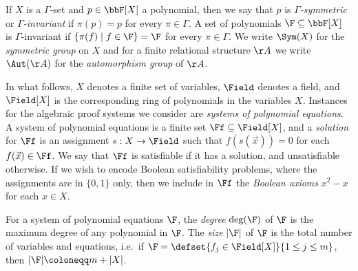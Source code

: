 \documentclass[a4paper,UKenglish,cleveref, autoref, thm-restate]{lipics-v2021}
\begin{document}
	If $X$ is a $\Gamma$-set and $p \in \bbF[X]$ a polynomial, then we say that $p$ is \emph{$\Gamma$-symmetric} or \emph{$\Gamma$-invariant} if $\pi(p) = p$ for every $\pi \in \Gamma$.  A set of polynomials $\F \subseteq \bbF[X]$ is $\Gamma$-invariant if $\{ \pi(f) \mid f \in \F  \} = \F$ for every $\pi \in \Gamma$.
	We write $\Sym(X)$ for the \emph{symmetric group} on $X$ and for a finite relational structure $\AA$ we write $\Aut(\AA)$ for the \emph{automorphism group} of $\AA$.
	
	In what follows, $X$ denotes a finite set of variables, $\Field$ denotes a field, and $\Field[X]$ is the corresponding ring of polynomials in the variables $X$. 
	Instances for the algebraic proof systems we consider are \emph{systems of polynomial equations}. A system of polynomial equations is a finite set $\Ff \subseteq \Field[X]$, and a \emph{solution} for $\Ff$ is an assignment $s: X \rightarrow \Field$ such that $f(s(\vec x)) = 0$ for each $f(\vec x) \in \Ff$. We say that $\Ff$ is satisfiable if it has a solution, and unsatisfiable otherwise. If we wish to encode Boolean satisfiability problems, where the assignments are in $\{0,1\}$ only, then we include in $\Ff$ the \emph{Boolean axioms} $x^2-x$ for each $x \in X$. 	
	 
	For a system of polynomial equations $\F$, the \emph{degree} $\deg(\F)$ of $\F$ is the maximum degree of any polynomial in $\F$.  The \emph{size} $|\F|$ of $\F$ is the total number of variables and equations, i.e.\ if $\F = \defset{f_j\in \Field[X]}{1 \leq j \leq m}$, then $|\F| \coloneqq m + |X|$.
	
	

	
\end{document}
